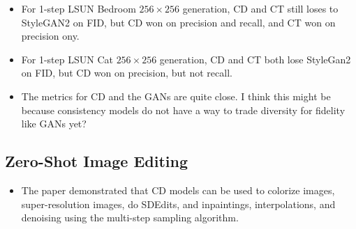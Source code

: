 \documentclass[10pt]{article}
\begin{document}
\begin{itemize}
  \item For 1-step LSUN Bedroom $256 \times 256$ generation, CD and CT still loses to StyleGAN2 on FID, but CD won on precision and recall, and CT won on precision ony.
  
  \item For 1-step LSUN Cat $256 \times 256$ generation, CD and CT both lose StyleGan2 on FID, but CD won on precision, but not recall.
  
  \item The metrics for CD and the GANs are quite close. I think this might be because consistency models do not have a way to trade diversity for fidelity like GANs yet?
\end{itemize}

\subsection{Zero-Shot Image Editing}

\begin{itemize}
  \item The paper demonstrated that CD models can be used to colorize images, super-resolution images, do SDEdits, and inpaintings, interpolations, and denoising using the multi-step sampling algorithm.
\end{itemize}


  
\end{document}
